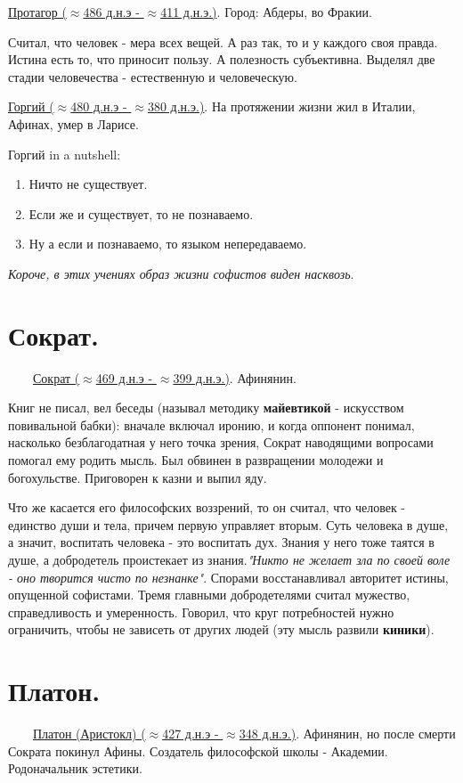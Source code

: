 \underline{Протагор ($\approx$486 д.н.э - $\approx$411 д.н.э.)}. Город: Абдеры, во Фракии.

Считал, что человек - мера всех вещей. А раз так, то и у каждого своя правда. Истина есть то, что приносит пользу. А полезность субъективна. Выделял две стадии человечества - естественную  и человеческую.

\underline{Горгий ($\approx$480 д.н.э - $\approx$380 д.н.э.)}. На протяжении жизни жил в Италии, Афинах, умер в Ларисе. 

Горгий in a nutshell:
\begin{enumerate}
\item Ничто не существует.
\item Если же и существует, то не познаваемо.
\item Ну а если и познаваемо, то языком непередаваемо.
\end{enumerate}

\textit{Короче, в этих учениях образ жизни софистов виден насквозь}.

\section{Сократ.}
\ \ \ \
\underline{Сократ ($\approx$469 д.н.э - $\approx$399 д.н.э.)}. Афинянин.

 Книг не писал, вел беседы (называл методику \textbf{майевтикой} - искусством повивальной бабки): вначале включал иронию, и когда оппонент понимал, насколько безблагодатная у него точка зрения, Сократ наводящими вопросами помогал ему родить мысль. Был обвинен в развращении молодежи и богохульстве. Приговорен к казни и выпил яду.

Что же касается его философских воззрений, то он считал, что человек - единство души и тела, причем первую управляет вторым. Суть человека в душе, а значит, воспитать человека - это воспитать дух. Знания у него тоже таятся в душе, а добродетель проистекает из знания.\textit{"Никто не желает зла по своей воле - оно творится чисто по незнанке"}. Спорами восстанавливал авторитет истины, опущенной софистами. 
Тремя главными добродетелями считал мужество, справедливость и умеренность. Говорил, что круг потребностей нужно ограничить, чтобы не зависеть от других людей (эту мысль развили \textbf{киники}).

\section{Платон.}
\ \ \ \
\underline{Платон (Аристокл) ($\approx$427 д.н.э - $\approx$348 д.н.э.)}. Афинянин, но после смерти Сократа покинул Афины. Создатель философской школы - Академии. Родоначальник эстетики.

